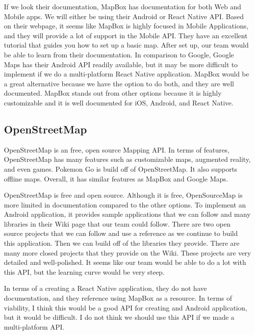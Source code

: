 \documentclass[draftclsnofoot, onecolumn, compsoc, 10pt]{IEEEtran}
\begin{document}
    If we look their documentation, MapBox has documentation for both Web and Mobile apps. We will either be using their Android or React Native API. Based on their webpage, it seems like MapBox is highly focused in Mobile Applications, and they will provide a lot of support in the Mobile API. They have an excellent tutorial that guides you how to set up a basic map. After set up, our team would be able to learn from their documentation. In comparison to Google, Google Maps has their Android API readily available, but it may be more difficult to implement if we do a multi-platform React Native application. MapBox would be a great alternative because we have the option to do both, and they are well documented. MapBox stands out from other options because it is highly customizable and it is well documented for iOS, Android, and React Native.
     \cite{MapBox}


     
     \subsection{OpenStreetMap}
     OpenStreetMap is an free, open source Mapping API. In terms of features, OpenStreetMap has many features such as customizable maps, augmented reality, and even games. Pokemon Go is build off of OpenStreetMap. It also supports offline maps. Overall, it has similar features as MapBox and Google Maps. 
     
     OpenStreetMap is free and open source. Although it is free, OpenSourceMap is more limited in documentation compared to the other options. To implement an Android application, it provides sample applications that we can follow and many libraries in their Wiki page that our team could follow. There are two open source projects that we can follow and use a reference as we continue to build this application. Then we can build off of the libraries they provide. There are many more closed projects that they provide on the Wiki. These projects are very detailed and well-polished. It seems like our team would be able to do a lot with this API, but the learning curve would be very steep.
     
     In terms of a creating a React Native application, they do not have documentation, and they reference using MapBox as a resource. In terms of viability, I think this would be a good API for creating and Android application, but it would be difficult. I do not think we should use this API if we made a multi-platform API.
      \cite{OpenStreetMap}
\end{document}
